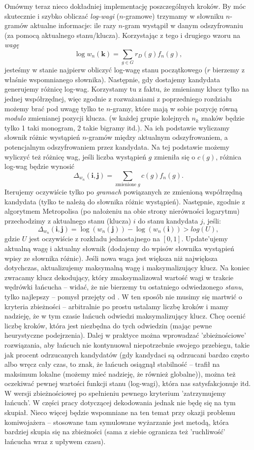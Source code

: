 \documentclass[a4paper]{article}
\theoremstyle{defn}
\theoremstyle{theorem}
\theoremstyle{lemma}
\theoremstyle{cor}
\theoremstyle{fact}
\begin{document}
Omówmy teraz nieco dokładniej implementację poszczególnych kroków. By móc skutecznie i szybko obliczać \textit{log-wagi} ($n$-gramowe) trzymamy w słowniku $n$-gramów aktualne informacje: ile razy $n$-gram wystąpił w danym odszyfrowaniu (za pomocą aktualnego stanu/klucza). Korzystając z tego i drugiego wzoru na \textit{wagę}
$$\log w_n(\boldsymbol{k}) =\sum\limits_{g \in G}  {r_D(g)} f_n(g),$$
jesteśmy w stanie najpierw obliczyć log-wagę stanu początkowego ($r$ bierzemy z właśnie wspomnianego słownika). Następnie, gdy dostajemy kandydata generujemy różnicę log-wag. Korzystamy tu z faktu, że zmieniamy klucz tylko na jednej współrzędnej, więc zgodnie z rozważaniami z poprzedniego rozdziału możemy brać pod uwagę tylko te $n$-gramy, które mają w sobie pozycję równą \textit{modulo} zmienianej pozycji klucza. (w każdej grupie kolejnych $n_k$ znaków będzie tylko 1 taki monogram, 2 takie bigramy itd.). Na ich podstawie wyliczamy słownik różnic wystąpień $n$-gramów między aktualnym odszyfrowaniem, a potencjalnym odszyfrowaniem przez kandydata. Na tej podstawie możemy wyliczyć też różnicę wag, jeśli liczba wystąpień $g$ zmieniła się o $c(g)$, różnica log-wag będzie wynosić
$$\Delta_{w_n}(\boldsymbol{i},\boldsymbol{j}) = \sum\limits_{\text{zmienione } g}  {c(g)} f_n(g).$$
Iterujemy oczywiście tylko po \textit{gramach} powiązanych ze zmienioną współrzędną kandydata (tylko te należą do słownika różnic wystąpień). Następnie, zgodnie z algorytmem Metropolisa (po nałożeniu na obie strony nierówności logarytmu) przechodzimy z aktualnego stanu (klucza) $i$ do stanu kandydata $j$, jeśli:
$$\Delta_{w_n}(\boldsymbol{i},\boldsymbol{j}) =\log(w_n(\boldsymbol{j})) - \log(w_n(\boldsymbol{i})) > log(U),$$ gdzie $U$ jest oczywiście z rozkładu jednostajnego na $[0,1]$. Update'ujemy aktualną wagę i aktualny słownik (dodajemy do wpisów słownika wystąpień wpisy ze słownika różnic). Jeśli nowa waga jest większa niż największa dotychczas, aktualizujemy maksymalną wagę i maksymalizujący klucz. Na koniec zwracamy klucz dekodujący, który zmaksymalizował wartość wagi w trakcie wędrówki łańcucha – widać, że nie bierzemy tu ostatniego odwiedzonego \textit{stanu}, tylko najlepszy – pomysł przejęty od \cite{Chen&Rosenthal}. W ten sposób nie musimy się martwić o kryteria zbieżności – arbitralnie po prostu ustalamy liczbę kroków i mamy nadzieję, że w tym czasie łańcuch odwiedzi maksymalizujący klucz. Chcę ocenić liczbę kroków, która jest niezbędna do tych odwiedzin (mając pewne heurystyczne podejrzenia). Dalej w praktyce można wprowadzać 'zbieżnościowe' rozwiązania, aby łańcuch nie kontynuował niepotrzebnie swojego przebiegu, takie jak procent odrzucanych kandydatów (gdy kandydaci są odrzucani bardzo często albo wręcz cały czas, to znak, że łańcuch osiągnął stabilność – trafił na maksimum lokalne (możemy mieć nadzieję, że również globalne)), można też oczekiwać pewnej wartości funkcji stanu (log-wagi), która nas satysfakcjonuje itd. W wersji zbieżnościowej po spełnieniu pewnego kryterium 'zatrzymujemy łańcuch'. W części pracy dotyczącej dekodowania jednak nie będę się na tym skupiał. Nieco więcej będzie wspomniane na ten temat przy okazji problemu komiwojażera – stosowane tam symulowane wyżarzanie jest metodą, która bardziej skupia się na zbieżności (sama z siebie ogranicza też 'ruchliwość' łańcucha wraz z upływem czasu).
\end{document}

